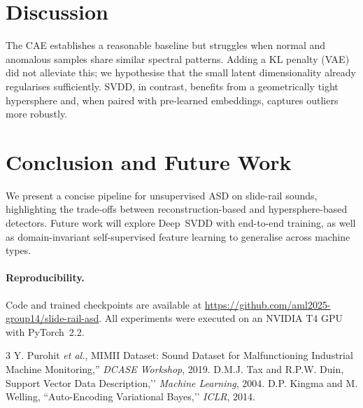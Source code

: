 \documentclass[11pt,a4paper]{article}
\begin{document}
\section{Discussion}
The CAE establishes a reasonable baseline but struggles when normal and anomalous samples share similar spectral patterns.  Adding a KL penalty (VAE) did not alleviate this; we hypothesise that the small latent dimensionality already regularises sufficiently.  SVDD, in contrast, benefits from a geometrically tight hypersphere and, when paired with pre-learned embeddings, captures outliers more robustly.

\section{Conclusion and Future Work}
We present a concise pipeline for unsupervised ASD on slide-rail sounds, highlighting the trade-offs between reconstruction-based and hypersphere-based detectors.  Future work will explore Deep~SVDD with end-to-end training, as well as domain-invariant self-supervised feature learning to generalise across machine types.

\paragraph{Reproducibility.}  Code and trained checkpoints are available at \url{https://github.com/aml2025-group14/slide-rail-asd}.  All experiments were executed on an NVIDIA T4 GPU with PyTorch~2.2.


\begin{thebibliography}{3}
 Y. Purohit \emph{et al.}, MIMII Dataset: Sound Dataset for Malfunctioning Industrial Machine Monitoring,'' \emph{DCASE Workshop}, 2019.  D.M.J. Tax and R.P.W. Duin, Support Vector Data Description,’’ \emph{Machine Learning}, 2004.
 D.P. Kingma and M. Welling, ``Auto-Encoding Variational Bayes,’’ \emph{ICLR}, 2014.
\end{thebibliography}
\end{document}
